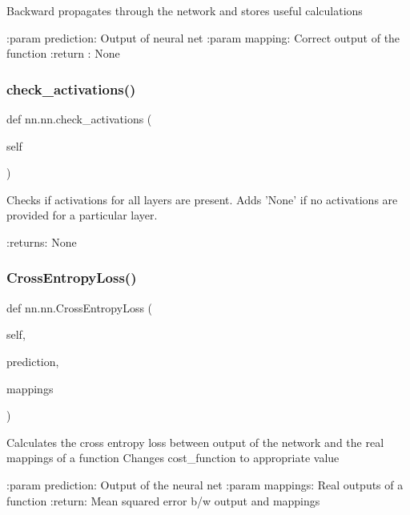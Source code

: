 \begin{DoxyVerb}Backward propagates through the network and stores useful calculations

:param prediction: Output of neural net
:param mapping: Correct output of the function
:return : None
\end{DoxyVerb}
 \mbox{\label{classnn_1_1nn_a15ee3f3e18ebae83c904b3441ece897d}} 
\subsubsection{\texorpdfstring{check\+\_\+activations()}{check\_activations()}}
{\footnotesize\ttfamily def nn.\+nn.\+check\+\_\+activations (\begin{DoxyParamCaption}\item[{}]{self }\end{DoxyParamCaption})}

\begin{DoxyVerb}Checks if activations for all layers are present. Adds 'None' if no activations are provided for a particular layer.

:returns: None
\end{DoxyVerb}
 \mbox{\label{classnn_1_1nn_a822299322a0b513f8985e61096be45bc}} 
\subsubsection{\texorpdfstring{Cross\+Entropy\+Loss()}{CrossEntropyLoss()}}
{\footnotesize\ttfamily def nn.\+nn.\+Cross\+Entropy\+Loss (\begin{DoxyParamCaption}\item[{}]{self,  }\item[{}]{prediction,  }\item[{}]{mappings }\end{DoxyParamCaption})}

\begin{DoxyVerb}Calculates the cross entropy loss between output of the network and the real mappings of a function
Changes cost_function to appropriate value

:param prediction: Output of the neural net
:param mappings: Real outputs of a function
:return: Mean squared error b/w output and mappings
\end{DoxyVerb}
 \mbox{\label{classnn_1_1nn_a475811849fd370a47eb0e3b7bc09b283}} 
